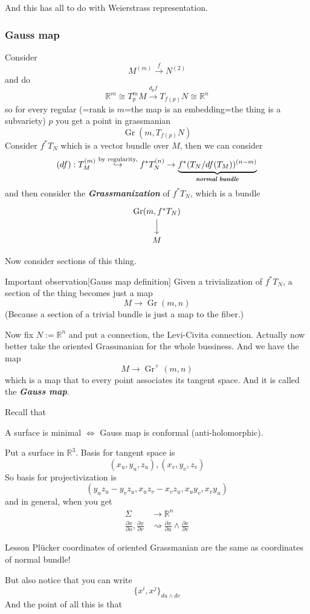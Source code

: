 \begin{remark}\leavevmode
And this has all to do with Weierstrass representation.
\end{remark}

\subsubsection{Gauss map}
Consider 
\[M^{(m)}\xrightarrow{f}N^{(2)}\]
and do
\[\mathbb{R}^m \cong T_p^m M \xrightarrow{d_pf}T_{f(p)}N \cong \mathbb{R}^n\]
so for every regular (=rank is \(m\)=the map is an embedding=the thing is a subvariety) \(p\) you get a point in grassmanian
\[\operatorname{Gr}(m,T_{f(p)}N)\]
Consider \(f^*T_N\) which is a vector bundle over \(M\), then we can consider
\[(df):T^{(m)}_M \overset{\text{by regularity,} }{\hookrightarrow } f^*T^{(n)}_N \to \underbrace{f^*(T_N / df(T_M))^{(n-m)}}_{\text{\textit{\textbf{normal bundle}}} }\]
and then consider the \textit{\textbf{Grassmanization}} of \(f^*T_N\), which is a bundle
\[\begin{tikzcd}
\operatorname{Gr}(m,f^*T_N)\arrow[d]\\
M
\end{tikzcd}\]

Now consider sections of this thing.

\begin{thing7}{Important observation}[Gauss map definition]\leavevmode
 Given a trivialization of \(f^*T_N\), a section of the thing becomes just a map
 \[M \to \operatorname{Gr}(m,n)\]
 (Because a section of a trivial bundle is just a map to the fiber.) 
\end{thing7}

Now fix \(N:= \mathbb{R}^n\) and put a connection, the Levi-Civita connection. Actually now better take the oriented Grassmanian for the whole bussiness. And we have the map
\[M \to \operatorname{Gr}^+(m,n)\]
which is a map that to every point associates its tangent space. And it is called the \textit{\textbf{Gauss map}}.

Recall that
\begin{claim}\leavevmode
A surface is minimal \(\iff\) Gauss map is conformal (anti-holomorphic).
\end{claim}

Put a surface in \(\mathbb{R}^3\). Basis for tangent space is
\[(x_u,y_u,z_u), (x_v,y_v,z_v)\]
So basis for projectivization is
\[(y_uz_u-y_vz_u, x_uz_v-x_vz_u,x_uy_v,x_vy_u)\]
and in general, when you get
\begin{align*}
\Sigma&\to \mathbb{R}^n\\
\frac{\partial x}{\partial u}, \frac{\partial x}{\partial v} &\rightsquigarrow \frac{\partial x}{\partial u}\wedge \frac{\partial x}{\partial v}
\end{align*}
\begin{thing8}{Lesson}\leavevmode
Plücker coordinates of oriented Grassmanian are the same as coordinates of normal bundle!
\end{thing8}
But also notice that you can write
\[\{x^i,x^j\}_{du \wedge dv}\]
And the point of all this is that 

